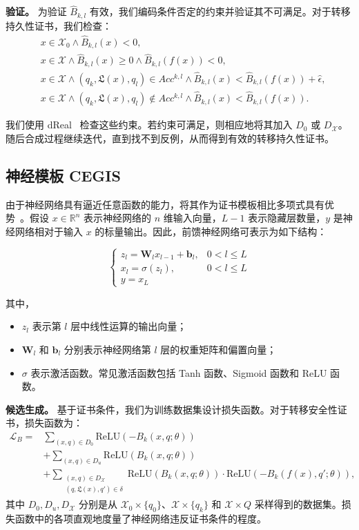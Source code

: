 \textbf{验证。} 为验证 $\hat{B}_{k,l}$ 有效，我们编码条件否定的约束并验证其不可满足。对于转移持久性证书，我们检查：
\begin{align}
  & x \in \mathcal{X}_0 \land \hat{B}_{k,l}(x) < 0, \label{smt:tp-cex-init} \\ 
  & x \in \mathcal{X} \land \hat{B}_{k,l}(x) \geq 0 \land \hat{B}_{k,l}(f(x)) < 0, \label{smt:tp-cex-inv} \\ 
  & x \in \mathcal{X} \land (q_k, \mathfrak{L}(x), q_l) \in Acc^{k,l} \land \hat{B}_{k,l}(x) < \hat{B}_{k,l}(f(x)) + \hat{\epsilon}, \label{smt:tp-cex-dec} \\ 
  & x \in \mathcal{X} \land (q_k, \mathfrak{L}(x), q_l) \notin Acc^{k,l} \land \hat{B}_{k,l}(x) < \hat{B}_{k,l}(f(x)). \label{smt:tp-cex-non-dec}
\end{align}

我们使用 dReal~\cite{gao2013dreal} 检查这些约束。若约束可满足，则相应地将其加入 $D_0$ 或 $D_{\mathcal{X}}$。随后合成过程继续迭代，直到找不到反例，从而得到有效的转移持久性证书。

\subsection{神经模板 CEGIS}
由于神经网络具有逼近任意函数的能力，将其作为证书模板相比多项式具有优势~\cite{zhao2020synthesizing}。假设 $x \in \mathbb{R}^n$ 表示神经网络的 $n$ 维输入向量，$L-1$ 表示隐藏层数量，$y$ 是神经网络相对于输入 $x$ 的标量输出。因此，前馈神经网络可表示为如下结构：

\[
\begin{cases}
z_l = \mathbf{W}_l x_{l-1} + \mathbf{b}_l, & 0 < l \leqslant L \\
x_l = \sigma(z_l), & 0 < l \leqslant L \\
y = x_L
\end{cases}
\tag{5}
\]

其中，
\begin{itemize}
    \item $z_l$ 表示第 $l$ 层中线性运算的输出向量；
    \item $\mathbf{W}_l$ 和 $\mathbf{b}_l$ 分别表示神经网络第 $l$ 层的权重矩阵和偏置向量；
    \item $\sigma$ 表示激活函数。常见激活函数包括 Tanh 函数、Sigmoid 函数和 ReLU 函数。
\end{itemize}

\textbf{候选生成。} 基于证书条件，我们为训练数据集设计损失函数。对于转移安全性证书，损失函数为：
\begin{align}
\mathcal{L}_B = &\sum_{(x,q) \in D_0} \text{ReLU}(-B_k(x, q; \theta)) \nonumber \\ 
&+ \sum_{(x,q) \in D_u} \text{ReLU}(B_k(x, q; \theta)) \nonumber \\ 
&+ \sum_{\substack{(x,q) \in D_{\mathcal{X}} \\ (q, \mathfrak{L}(x), q') \in \delta}} \text{ReLU}(B_k(x, q; \theta)) \cdot \text{ReLU}(-B_k(f(x), q'; \theta)),
\end{align}
其中 $D_0, D_u, D_{\mathcal{X}}$ 分别是从 $\mathcal{X}_0 \times \{q_0\}$、$\mathcal{X} \times \{q_k\}$ 和 $\mathcal{X} \times Q$ 采样得到的数据集。损失函数中的各项直观地度量了神经网络违反证书条件的程度。

